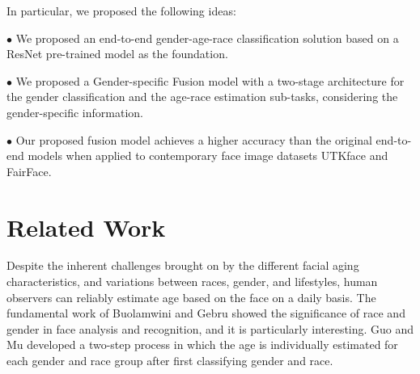 \documentclass[DIV=calc, paper=a4, fontsize=10pt, twocolumn]{article}
\begin{document}
	In particular, we proposed the following ideas:
	
	$\bullet$ We proposed an end-to-end gender-age-race classification solution based on a ResNet pre-trained model as the foundation.
	
	$\bullet$ We proposed a Gender-specific Fusion model with a two-stage architecture for the gender classification and the age-race estimation sub-tasks, considering the gender-specific information. 
	
	$\bullet$ Our proposed fusion model achieves a higher accuracy than the original end-to-end models when applied to contemporary face image datasets UTKface and FairFace. 
	
	\section{Related Work}
	Despite the inherent challenges brought on by the different facial aging characteristics, and variations between races, gender, and lifestyles, human observers can reliably estimate age based on the face on a daily basis. The fundamental work of Buolamwini and Gebru \cite{Guo2010HumanAE} showed the significance of race and gender in face analysis and recognition, and it is particularly interesting. Guo and Mu \cite{pmlr-v81-buolamwini18a} developed a two-step process in which the age is individually estimated for each gender and race group after first classifying gender and race.
	
\end{document}
